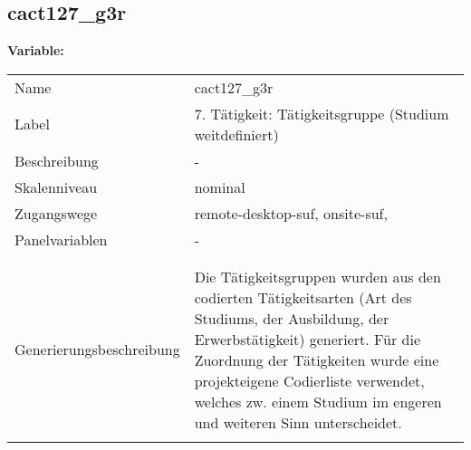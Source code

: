 	
	
	\subsection{cact127\_g3r}
	\label{subSection:cact127_g3r}

	\noindent\textbf{Variable:}\\
		\begin{tabular}{lL{11.3cm}}
			\label{tableVariable:cact127_g3r}
			Name & cact127\_g3r \\
			Label & 7. Tätigkeit: Tätigkeitsgruppe (Studium weitdefiniert) \\
			Beschreibung & - \\
			Skalenniveau & nominal \\
			Zugangswege &
				remote-desktop-suf,
				onsite-suf,
 \\
			Panelvariablen & -
			 \\
			 \\
 \\
					Generierungsbeschreibung & Die Tätigkeitsgruppen wurden aus den codierten Tätigkeitsarten (Art des Studiums, der Ausbildung, der Erwerbstätigkeit) generiert. Für die Zuordnung der Tätigkeiten wurde eine projekteigene Codierliste verwendet, welches zw. einem Studium im engeren und weiteren Sinn unterscheidet.
				 \\	
			 \\
		\end{tabular}






